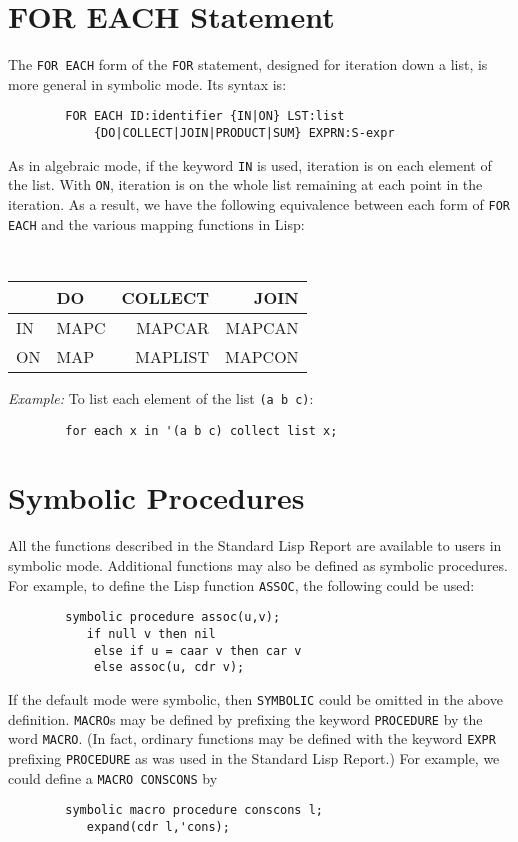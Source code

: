 \section{FOR EACH Statement}

The {\tt FOR EACH} form of the {\tt FOR} statement, designed for iteration
down a list, is more general in symbolic mode.  Its syntax is:

\begin{verbatim}
        FOR EACH ID:identifier {IN|ON} LST:list
            {DO|COLLECT|JOIN|PRODUCT|SUM} EXPRN:S-expr
\end{verbatim}

As in algebraic mode, if the keyword {\tt IN} is used, iteration is on
each element of the list.  With {\tt ON}, iteration is on the whole list
remaining at each point in the iteration.  As a result, we have the
following equivalence between each form of {\tt FOR EACH} and the various
mapping functions in Lisp:
\begin{center}
{\tt
\begin{tabular}{|l|lr r|} \hline
& DO & COLLECT & JOIN \\ \hline
        IN &   MAPC & MAPCAR & MAPCAN \\
        ON &   MAP &  MAPLIST & MAPCON \\ \hline
\end{tabular}}
\end{center}
{\it Example:} To list each element of the list {\tt (a b c)}:
\begin{verbatim}
        for each x in '(a b c) collect list x;
\end{verbatim}

\section{Symbolic Procedures}

All the functions described in the Standard Lisp Report are available to
users in symbolic mode. Additional functions may also be defined as
symbolic procedures. For example, to define the Lisp function {\tt ASSOC},
the following could be used:
\begin{verbatim}
        symbolic procedure assoc(u,v);
           if null v then nil
            else if u = caar v then car v
            else assoc(u, cdr v);
\end{verbatim}
If the default mode were symbolic, then {\tt SYMBOLIC} could be omitted in
the above definition. {\tt MACRO}s may be defined by
prefixing the keyword {\tt PROCEDURE} by the word {\tt MACRO}.
(In fact, ordinary functions may be defined with the keyword {\tt EXPR}
 prefixing {\tt PROCEDURE} as was used in the Standard Lisp
Report.) For example, we could define a {\tt MACRO CONSCONS} by
\begin{verbatim}
        symbolic macro procedure conscons l;
           expand(cdr l,'cons);
\end{verbatim}

